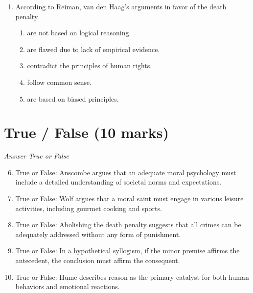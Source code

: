 \documentclass[12pt]{article}
\begin{document}
\begin{enumerate}[label=\arabic*.]
\begin{enumerate}[label=(\alph*)]
    \item should primarily focus on preserving the natural environment.
    \item must align with societal norms and expectations.
    \item are based solely on religious doctrines.
\end{enumerate}
\item According to Reiman, van den Haag's arguments in favor of the death penalty
\begin{enumerate}[label=(\alph*)]
    \item are not based on logical reasoning.
    \item are flawed due to lack of empirical evidence.
    \item contradict the principles of human rights.
    \item follow common sense.
    \item are based on biased principles.
\end{enumerate}
\end{enumerate}

\section*{True / False (10 marks)}
\textit{Answer True or False}
\begin{enumerate}[label=\arabic*.]
\setcounter{enumi}{5}
\item True or False: Anscombe argues that an adequate moral psychology must include a detailed understanding of societal norms and expectations.
\item True or False: Wolf argues that a moral saint must engage in various leisure activities, including gourmet cooking and sports.
\item True or False: Abolishing the death penalty suggests that all crimes can be adequately addressed without any form of punishment.
\item True or False: In a hypothetical syllogism, if the minor premise affirms the antecedent, the conclusion must affirm the consequent.
\item True or False: Hume describes reason as the primary catalyst for both human behaviors and emotional reactions.
\end{enumerate}
\end{document}
